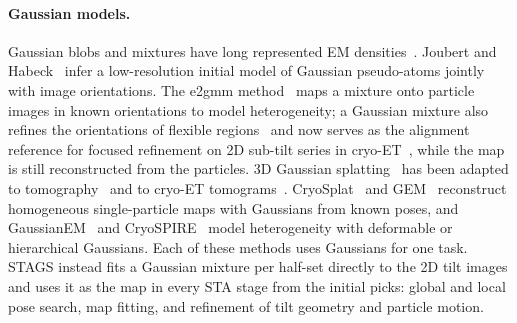 \paragraph{Gaussian models.}
Gaussian blobs and mixtures have long represented EM densities~\cite{marabini1998blobs,kawabata2008gmm}.
Joubert and Habeck~\cite{joubert2015gmm} infer a low-resolution initial model of Gaussian pseudo-atoms jointly with image orientations.
The e2gmm method~\cite{chen2021e2gmm,chen2023gmm} maps a mixture onto particle images in known orientations to model heterogeneity; a Gaussian mixture also refines the orientations of flexible regions~\cite{chen2024gmmrefine} and now serves as the alignment reference for focused refinement on 2D sub-tilt series in cryo-ET~\cite{chen2026gmmfocused}, while the map is still reconstructed from the particles.
3D Gaussian splatting~\cite{kerbl2023gaussian} has been adapted to tomography~\cite{zha2024r2gaussian} and to cryo-ET tomograms~\cite{zhang2026cryoetgs}.
CryoSplat~\cite{chen2026cryosplat} and GEM~\cite{qu2025gem} reconstruct homogeneous single-particle maps with Gaussians from known poses, and GaussianEM~\cite{he2025gaussianem} and CryoSPIRE~\cite{shekarforoush2025cryospire} model heterogeneity with deformable or hierarchical Gaussians.
Each of these methods uses Gaussians for one task.
STAGS instead fits a Gaussian mixture per half-set directly to the 2D tilt images and uses it as the map in every STA stage from the initial picks: global and local pose search, map fitting, and refinement of tilt geometry and particle motion.
